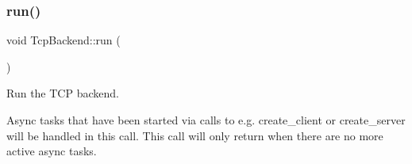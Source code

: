 \subsubsection{\texorpdfstring{run()}{run()}}
{\footnotesize\ttfamily void Tcp\+Backend\+::run (\begin{DoxyParamCaption}{ }\end{DoxyParamCaption})}



Run the T\+CP backend. 

Async tasks that have been started via calls to e.\+g. create\+\_\+client or create\+\_\+server will be handled in this call. This call will only return when there are no more active async tasks. 